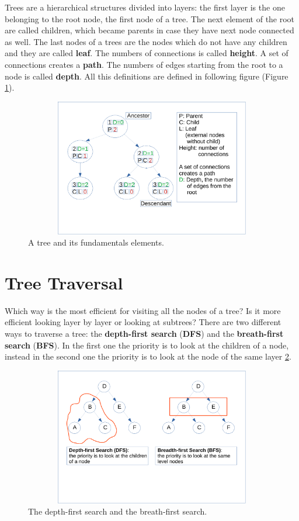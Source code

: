 Trees are a hierarchical structures divided into layers: the first layer is the one belonging to the root node, the first node of a tree. The next element of the root are called children, which became parents in case they have next node connected as well. The last nodes of a trees are the nodes which do not have any children and they are called \textbf{leaf}. The numbers of connections is called \textbf{height}. A set of connections creates a \textbf{path}. The numbers of edges starting from the root to a node is called \textbf{depth}.
All this definitions are defined in following figure (Figure \ref{trees_3}).

\begin{figure}[hb]
	\includegraphics[width=14cm,height=6cm]{chapters/trees/images/trees_3.pdf}
	\caption[]{A tree and its fundamentals elements.}
	\label{trees_3}
\end{figure}

\section{Tree Traversal}
Which way is the most efficient for visiting all the nodes of a tree? Is it more efficient looking layer by layer or looking at subtrees? There are two different ways to traverse a tree: the \textbf{depth-first search} (\textbf{DFS}) and the \textbf{breath-first search} (\textbf{BFS}). In the first one the priority is to look at the children of a node, instead in the second one the priority is to look at the node of the same layer \ref{trees_4}.

\begin{figure}[hb]
	\includegraphics[width=14cm,height=6cm]{chapters/trees/images/trees_4.pdf}
	\caption[]{The depth-first search and the breath-first search.}
	\label{trees_4}
\end{figure}

